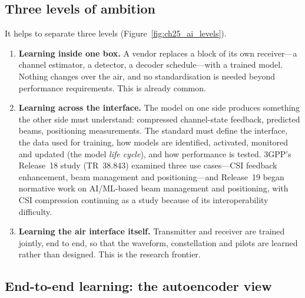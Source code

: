 \subsection{Three levels of ambition}

It helps to separate three levels (Figure~\ref{fig:ch25_ai_levels}).
\begin{enumerate}
\item \textbf{Learning inside one box.} A vendor replaces a block of its own receiver---a channel
estimator, a detector, a decoder schedule---with a trained model. Nothing changes over the air, and no
standardisation is needed beyond performance requirements. This is already common.
\item \textbf{Learning across the interface.} The model on one side produces something the other side
must understand: compressed channel-state feedback, predicted beams, positioning measurements. The
standard must define the interface, the data used for training, how models are identified, activated,
monitored and updated (the model \emph{life cycle}), and how performance is tested. 3GPP's Release~18
study (TR~38.843) examined three use cases---CSI feedback enhancement, beam management and
positioning---and Release~19 began normative work on AI/ML-based beam management and positioning,
with CSI compression continuing as a study because of its interoperability difficulty.
\item \textbf{Learning the air interface itself.} Transmitter and receiver are trained jointly,
end to end, so that the waveform, constellation and pilots are learned rather than designed. This is
the research frontier.
\end{enumerate}


\subsection{End-to-end learning: the autoencoder view}


